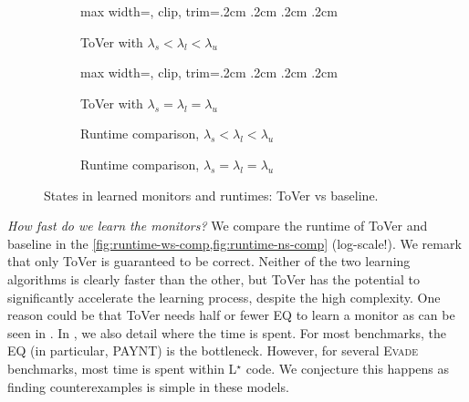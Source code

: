 \documentclass[runningheads]{llncs}
\renewcommand{\paragraph}[1]{\smallskip\noindent\emph{#1}}
\newcommand{\alg}{ToVer\xspace}
\begin{document}
\begin{figure}[t]
    \begin{subfigure}{.241\linewidth}
        \begin{adjustbox}{max width=\linewidth, clip, trim=.2cm .2cm .2cm .2cm}
            
        \end{adjustbox}
        \caption{\alg with $\lambda_s < \lambda_l < \lambda_u$}
        \label{fig:monsizes}
    \end{subfigure}\hfill
    \begin{subfigure}{.209\linewidth}
        \begin{adjustbox}{max width=\linewidth, clip, trim=.2cm .2cm .2cm .2cm}
            
        \end{adjustbox}
        \caption{\alg with $\lambda_s=\lambda_l=\lambda_u$}
        \label{fig:monsizens}
    \end{subfigure}\hfill
    \begin{subfigure}{.265\linewidth}
        \resizebox{\linewidth}{!}{
            }
        \caption{Runtime comparison, $\lambda_s < \lambda_l < \lambda_u$}
        \label{fig:runtime-ws-comp}
    \end{subfigure}\hfill
    \begin{subfigure}{.251\linewidth}
        \resizebox{\linewidth}{!}{
            }
        \caption{Runtime comparison, $\lambda_s=\lambda_l=\lambda_u$}
        \label{fig:runtime-ns-comp}
    \end{subfigure}
    \caption{States in learned monitors and runtimes: \alg vs baseline.}
\end{figure}

\paragraph{How fast do we learn the monitors?}
We compare the runtime of \alg and baseline in the \cref{fig:runtime-ws-comp,fig:runtime-ns-comp} (log-scale!).
We remark that only \alg{} is guaranteed to be correct. Neither of the two learning algorithms is clearly faster than the other, but \alg{} has the potential to significantly accelerate the learning process, despite the high complexity. One reason could be that \alg needs half or fewer EQ to learn a monitor as can be seen in . In , we also detail where the time is spent. For most benchmarks, the EQ (in particular, PAYNT) is the bottleneck. However, for several \textsc{Evade} benchmarks, most time is spent within L$^\star$ code. We conjecture this happens as finding counterexamples is simple in these models.
\end{document}
